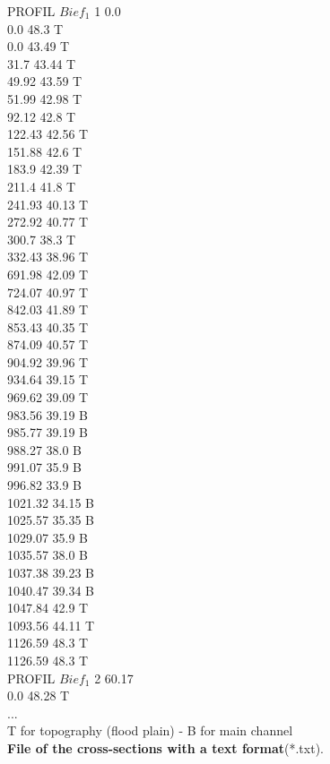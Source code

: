 \documentclass[a4paper,12pt]{article}
\begin{document}
PROFIL $Bief_1$ 1 0.0\\
0.0 48.3 T\\
0.0 43.49 T\\
31.7 43.44 T\\
49.92 43.59 T\\
51.99 42.98 T\\
92.12 42.8 T\\
122.43 42.56 T\\
151.88 42.6 T\\
183.9 42.39 T\\
211.4 41.8 T\\
241.93 40.13 T\\
272.92 40.77 T\\
300.7 38.3 T\\
332.43 38.96 T\\
691.98 42.09 T\\
724.07 40.97 T\\
842.03 41.89 T\\
853.43 40.35 T\\
874.09 40.57 T\\
904.92 39.96 T\\
934.64 39.15 T\\
969.62 39.09 T\\
983.56 39.19 B\\
985.77 39.19 B\\
988.27 38.0 B\\
991.07 35.9 B\\
996.82 33.9 B\\
1021.32 34.15 B\\
1025.57 35.35 B\\
1029.07 35.9 B\\
1035.57 38.0 B\\
1037.38 39.23 B\\
1040.47 39.34 B\\
1047.84 42.9 T\\
1093.56 44.11 T\\
1126.59 48.3 T\\
1126.59 48.3 T\\
PROFIL $Bief_1$ 2 60.17\\
0.0 48.28 T\\
...\\

T for topography (flood plain) - B for main channel\\
\vspace{0.5cm}
\textbf{File of the cross-sections with a text format}(*.txt).\\
\end{document}
